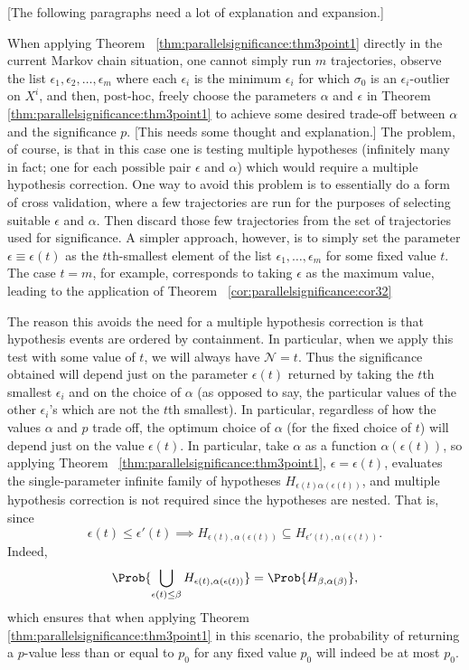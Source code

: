 \documentclass[12pt]{article}
\begin{document}
[The following paragraphs need a lot of explanation and expansion.]

When applying Theorem~%
\ref{thm:parallelsignificance:thm3point1} directly in the current Markov
chain situation, one cannot simply run \( m \) trajectories, observe the
list \( \epsilon_1 , \epsilon_2, \dots, \epsilon_ m \) where each \(
\epsilon_i \) is the minimum \( \epsilon_i \) for which \( \sigma_0 \)
is an \( \epsilon_i \)-outlier on \( X^i \), and then, post-hoc, freely
choose the parameters \( \alpha \) and \( \epsilon \) in Theorem~%
\ref{thm:parallelsignificance:thm3point1} to achieve some desired
trade-off between \( \alpha \) and the significance \( p \).  [This
needs some thought and explanation.] The problem, of course, is that in
this case one is testing multiple hypotheses (infinitely many in fact;
one for each possible pair \( \epsilon \) and \( \alpha \)) which would
require a multiple hypothesis correction.  One way to avoid this problem
is to essentially do a form of cross validation, where a few
trajectories are run for the purposes of selecting suitable \( \epsilon \)
and \( \alpha \). Then discard those few trajectories from the set of
trajectories used for significance.  A simpler approach, however, is to
simply set the parameter \( \epsilon \equiv \epsilon(t) \) as the \( t \)th-smallest
element of the list \( \epsilon_1, \dots, \epsilon_m \) for some fixed
value \( t \).  The case \( t = m \), for example, corresponds to taking
\( \epsilon \) as the maximum value, leading to the application of
Theorem~%
\ref{cor:parallelsignificance:cor32}

The reason this avoids the need for a multiple hypothesis correction is
that hypothesis events are ordered by containment.  In particular, when
we apply this test with some value of \( t \), we will always have \(
\mathcal{N} = t \).  Thus the significance obtained will depend just on
the parameter \( \epsilon(t) \) returned by taking the \( t \)th
smallest \( \epsilon_i \) and on the choice of \( \alpha \) (as opposed
to say, the particular values of the other \( \epsilon_i \)'s which are
not the \( t \)th smallest).  In particular, regardless of how the
values \( \alpha \) and \( p \) trade off, the optimum choice of \(
\alpha \) (for the fixed choice of \( t \)) will depend just on the
value \( \epsilon(t) \).  In particular, take \( \alpha \) as a function
\( \alpha(\epsilon(t) ) \), so applying Theorem~%
\ref{thm:parallelsignificance:thm3point1}, \( \epsilon = \epsilon(t) \),
evaluates the single-parameter infinite family of hypotheses \( H_{\epsilon
(t) \alpha(\epsilon(t)) } \), and multiple hypothesis correction is not
required since the hypotheses are nested.  That is, since
\[
    \epsilon(t) \le \epsilon' (t) \implies H_{\epsilon(t),\alpha(\epsilon
    (t) )} \subseteq H_{\epsilon' (t) ,\alpha(\epsilon(t) )}.
\] Indeed,
\[
    \Prob{ \bigcup_{\epsilon(t) \le \beta } H_{\epsilon(t) ,\alpha(\epsilon
    (t))} } = \Prob{H_{\beta, \alpha(\beta)}},
\] which ensures that when applying Theorem~%
\ref{thm:parallelsignificance:thm3point1} in this scenario, the
probability of returning a \( p \)-value less than or equal to \( p_0 \)
for any fixed value \( p_0 \) will indeed be at most \( p_0 \).
\end{document}
